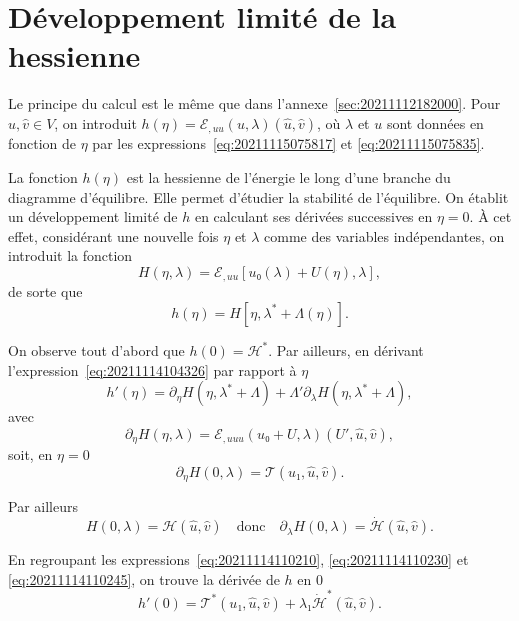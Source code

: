 \documentclass[12pt, final]{amsart}
\begin{document}
\section{Développement limité de la hessienne}
\label{sec:20211115081016}

Le principe du calcul est le même que dans
l'annexe~\ref{sec:20211112182000}. Pour \(\hat{u}, \hat{v}∈ V\), on introduit
\(h(η)=ℰ_{,uu}(u, \lambda)(\hat{u}, \hat{v})\), où \(\lambda\) et
\(u\) sont données en fonction de \(η\) par les
expressions~\eqref{eq:20211115075817} et \eqref{eq:20211115075835}.

La fonction \(h(η)\) est la hessienne de l'énergie le long d'une branche du
diagramme d'équilibre. Elle permet d'étudier la stabilité de l'équilibre. On
établit un développement limité de \(h\) en calculant ses dérivées successives
en \(η=0\). \`A cet effet, considérant une nouvelle fois \(η\) et
\(\lambda\) comme des variables indépendantes, on introduit la fonction
\begin{equation}
  H(η, \lambda)=ℰ_{,uu}[u₀(\lambda)+U(η), \lambda],
\end{equation}
de sorte que
\begin{equation}
  \label{eq:20211114104326}
  h(η)=H[η, \lambda^\ast+\Lambda(η)].
\end{equation}

On observe tout d'abord que \(h(0)=ℋ^\ast\). Par ailleurs, en dérivant
l'expression~\eqref{eq:20211114104326} par rapport à \(η\)
\begin{equation}
  \label{eq:20211114110210}
  h'(η)=\partial_η H(η, \lambda^\ast+\Lambda)
  +\Lambda'\partial_\lambda H(η, \lambda^\ast+\Lambda),
\end{equation}
avec
\begin{equation}
  \label{eq:20211114110852}
  \partial_η H(η, \lambda)=ℰ_{,uuu}(u₀+U, \lambda)(U', \hat{u}, \hat{v}),
\end{equation}
soit, en \(η=0\)
\begin{equation}
  \label{eq:20211114110230}
  \partial_η H(0, \lambda)=\mathcal T(u₁, \hat{u}, \hat{v}).
\end{equation}

Par ailleurs
\begin{equation}
  \label{eq:20211114110245}
  H(0, \lambda)=ℋ(\hat{u}, \hat{v})
  \quad\text{donc}\quad
  \partial_\lambda H(0, \lambda)=\dot{ℋ}(\hat{u}, \hat{v}).
\end{equation}

En regroupant les expressions~\eqref{eq:20211114110210},
\eqref{eq:20211114110230} et \eqref{eq:20211114110245}, on trouve la dérivée de
\(h\) en 0
\begin{equation}
  h'(0)=\mathcal T^\ast(u₁, \hat{u}, \hat{v})
  +\lambda₁\dot{ℋ}^\ast(\hat{u}, \hat{v}).
\end{equation}
\end{document}
